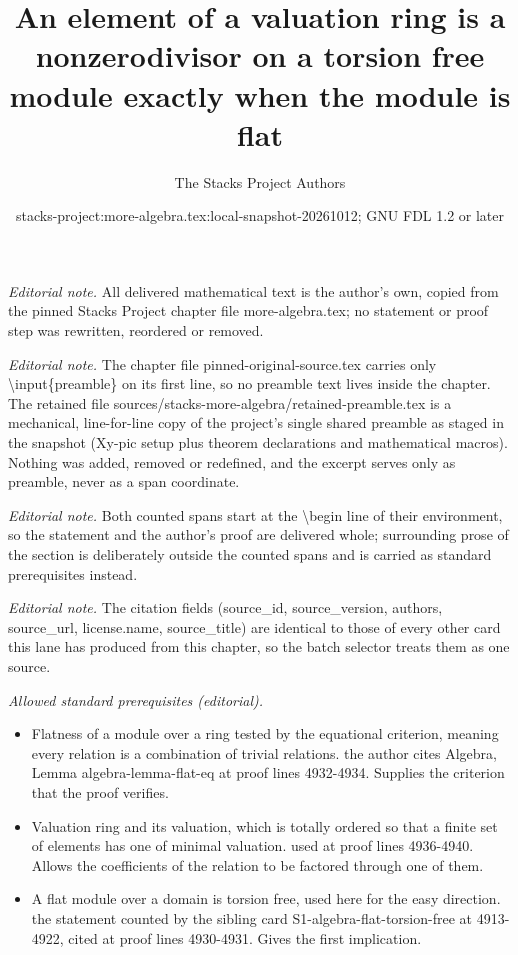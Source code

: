 \documentclass[10pt,a4paper]{amsart}
\title{An element of a valuation ring is a nonzerodivisor on a torsion free module exactly when the module is flat}
\author{The Stacks Project Authors}
\date{stacks-project:more-algebra.tex:local-snapshot-20261012; GNU FDL 1.2 or later}
\theoremstyle{plain}
\theoremstyle{definition}
\theoremstyle{remark}
\numberwithin{equation}{subsection}
\begin{document}
\maketitle
\setcounter{subsection}{1}
\noindent\textit{Editorial note.} All delivered mathematical text is the author's own, copied from the pinned Stacks Project chapter file more-algebra.tex; no statement or proof step was rewritten, reordered or removed.\par\medskip
\noindent\textit{Editorial note.} The chapter file pinned-original-source.tex carries only \textbackslash{}input\{preamble\} on its first line, so no preamble text lives inside the chapter. The retained file sources/stacks-more-algebra/retained-preamble.tex is a mechanical, line-for-line copy of the project's single shared preamble as staged in the snapshot (Xy-pic setup plus theorem declarations and mathematical macros). Nothing was added, removed or redefined, and the excerpt serves only as preamble, never as a span coordinate.\par\medskip
\noindent\textit{Editorial note.} Both counted spans start at the \textbackslash{}begin line of their environment, so the statement and the author's proof are delivered whole; surrounding prose of the section is deliberately outside the counted spans and is carried as standard prerequisites instead.\par\medskip
\noindent\textit{Editorial note.} The citation fields (source\_id, source\_version, authors, source\_url, license.name, source\_title) are identical to those of every other card this lane has produced from this chapter, so the batch selector treats them as one source.\par\medskip
\noindent\textit{Allowed standard prerequisites (editorial).}\begin{itemize}
\item Flatness of a module over a ring tested by the equational criterion, meaning every relation is a combination of trivial relations. the author cites Algebra, Lemma algebra-lemma-flat-eq at proof lines 4932-4934. Supplies the criterion that the proof verifies.
\item Valuation ring and its valuation, which is totally ordered so that a finite set of elements has one of minimal valuation. used at proof lines 4936-4940. Allows the coefficients of the relation to be factored through one of them.
\item A flat module over a domain is torsion free, used here for the easy direction. the statement counted by the sibling card S1-algebra-flat-torsion-free at 4913-4922, cited at proof lines 4930-4931. Gives the first implication.
\end{itemize}\medskip
\end{document}
